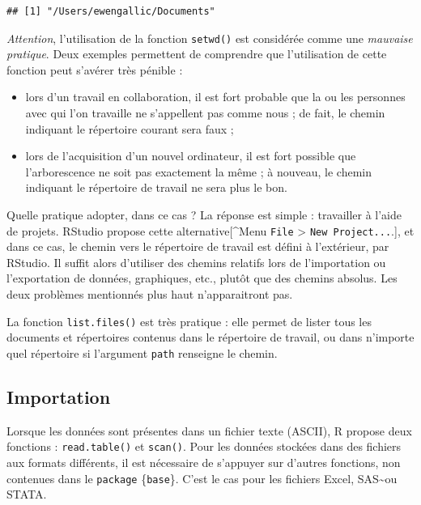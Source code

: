 \documentclass[
  11pt,
]{book}
\providecommand{\tightlist}{%
  \setlength{\itemsep}{0pt}\setlength{\parskip}{0pt}}
\numberwithin{equation}{section}
\newcounter{countremarque}
\newenvironment{remarque}{%
 \refstepcounter{countremarque}
    \begin{tcolorbox}[width=\linewidth, colback=blue!3, boxrule=0.5pt,arc=0pt,title = Remarque \thecountremarque]
    }%
    {
    \end{tcolorbox}
    }
\numberwithin{countremarque}{section}
\begin{document}
\begin{lstlisting}
## [1] "/Users/ewengallic/Documents"
\end{lstlisting}

\emph{Attention}, l'utilisation de la fonction \texttt{setwd()} est considérée comme une \emph{mauvaise pratique}. Deux exemples permettent de comprendre que l'utilisation de cette fonction peut s'avérer très pénible :

\begin{itemize}
\tightlist
\item
  lors d'un travail en collaboration, il est fort probable que la ou les personnes avec qui l'on travaille ne s'appellent pas comme nous ; de fait, le chemin indiquant le répertoire courant sera faux ;
\item
  lors de l'acquisition d'un nouvel ordinateur, il est fort possible que l'arborescence ne soit pas exactement la même ; à nouveau, le chemin indiquant le répertoire de travail ne sera plus le bon.
\end{itemize}

Quelle pratique adopter, dans ce cas ? La réponse est simple : travailler à l'aide de projets. RStudio propose cette alternative{[}\^{}Menu \texttt{File} \textgreater{} \texttt{New\ Project...}.{]}, et dans ce cas, le chemin vers le répertoire de travail est défini à l'extérieur, par RStudio. Il suffit alors d'utiliser des chemins relatifs lors de l'importation ou l'exportation de données, graphiques, etc., plutôt que des chemins absolus. Les deux problèmes mentionnés plus haut n'apparaitront pas.

\begin{remarque}
La fonction \texttt{list.files()} est très pratique : elle permet de lister tous les documents et répertoires contenus dans le répertoire de travail, ou dans n'importe quel répertoire si l'argument \texttt{path} renseigne le chemin.
\end{remarque}

\hypertarget{importation}{%
\subsection{Importation}\label{importation}}

Lorsque les données sont présentes dans un fichier texte (ASCII), R propose deux fonctions : \texttt{read.table()} et \texttt{scan()}. Pour les données stockées dans des fichiers aux formats différents, il est nécessaire de s'appuyer sur d'autres fonctions, non contenues dans le \texttt{package} \{\texttt{base}\}. C'est le cas pour les fichiers Excel, SAS\textasciitilde ou STATA.
\end{document}
